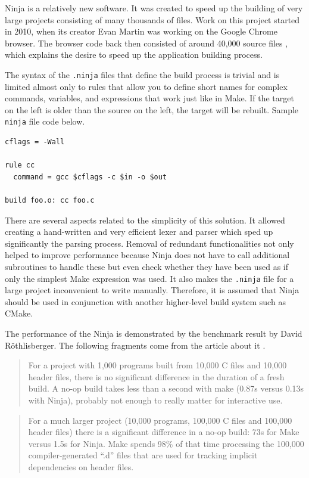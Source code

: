 Ninja is a relatively new software. It was created to speed up the
building of very large projects consisting of many thousands of files.
Work on this project started in 2010, when its creator Evan Martin was
working on the Google Chrome browser. The browser code back then
consisted of around 40,000 source files \cite{NINJACHROME}, which explains the desire to
speed up the application building process.

The syntax of the \texttt{.ninja} files that define the build process is trivial
and is limited almost only to rules that allow you to define short names
for complex commands, variables, and expressions that work just like
in Make. If the target on the left is older than the source on the left,
the target will be rebuilt. Sample \texttt{ninja} file code below.

\begin{lstlisting}[frame=single, caption={%
  Example of simple \texttt{.ninja} file \cite{NINJAFILE}%
}]
cflags = -Wall

rule cc
  command = gcc $cflags -c $in -o $out

build foo.o: cc foo.c
\end{lstlisting}

There are several aspects related to the simplicity of this solution. It
allowed creating a hand-written and very efficient lexer and parser
which sped up significantly the parsing process. Removal of redundant
functionalities not only helped to improve performance because Ninja does
not have to call additional subroutines to handle these but even check
whether they have been used as if only the simplest Make expression was
used. It also makes the \texttt{.ninja} file for a large project inconvenient to
write manually. Therefore, it is assumed that Ninja should be used in
conjunction with another higher-level build system such as CMake.

The performance of the Ninja is demonstrated by the benchmark result by
David Röthlisberger. The following fragments come from the article about it \cite{BENCHMARK}.

\begin{quote}
For a project with 1,000 programs built from 10,000 C files and 10,000
header files, there is no significant difference in the duration of a
fresh build. A no-op build takes less than a second with make (0.87s
versus 0.13s with Ninja), probably not enough to really matter for
interactive use.
\end{quote}

\begin{quote}
For a much larger project (10,000 programs, 100,000 C files and 100,000
header files) there is a significant difference in a no-op build: 73s
for Make versus 1.5s for Ninja. Make spends 98\% of that time processing
the 100,000 compiler-generated ``.d'' files that are used for tracking
implicit dependencies on header files.
\end{quote}

